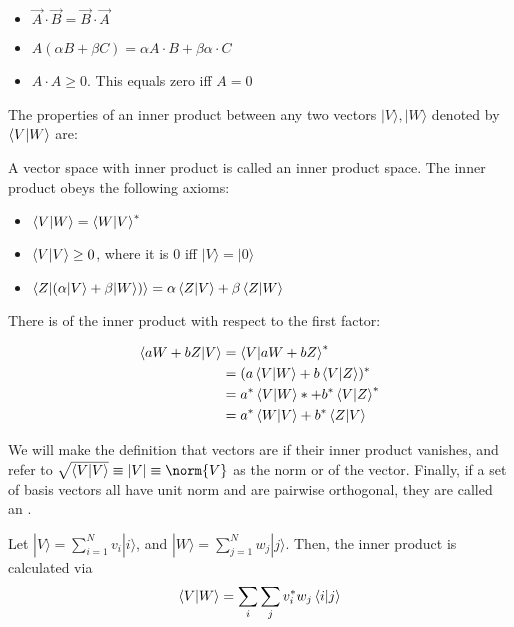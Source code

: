 \documentclass[11pt]{scrartcl}
\begin{document}
\begin{itemize}
	\item $ \vec{A} \cdot \vec{B} = \vec{B}\cdot \vec{A}$
	\item $A ( \alpha B + \beta C) = \alpha A\cdot B + \beta \alpha \cdot C$
	\item $A \cdot A \geq 0$. This equals zero iff $ A = 0 $
\end{itemize}

The properties of an inner product between any two vectors $ |V \rangle , |W \rangle  $ denoted by $ \braket{V|W}  $ are: 

\begin{definition}
A vector space with inner product is called an inner product space. The inner product obeys the following axioms:
\begin{itemize}
	\item $ \braket{V|W}  = \braket{W|V} ^* $
	\item $ \braket{V|V} \geq 0 $, where it is 0 iff $ |V \rangle  = |0 \rangle  $
	\item $ \braket{Z|(\alpha | V\rangle + \beta |W \rangle)}  = \alpha \braket{Z|V} + \beta \braket{Z|W}  $
\end{itemize}

\end{definition}

There is  of the inner product with respect to the first factor: 

\begin{align}
	\braket{aW + bZ|V} &= \braket{V|aW + bZ} ^* \\
			   &= (a \braket{V|W} + b \braket{V|Z} )^* \\
			   &= a^* \braket{V|W}* + b^* \braket{V|Z} ^* \\
			   &= a^* \braket{W|V} + b^* \braket{Z|V} 
\end{align}



We will make the definition that vectors are  if their inner product vanishes, and refer to $ \sqrt{ \braket{V|V} } \equiv | V | \equiv \norm{V}$ as the norm or  of the vector. Finally, if a set of basis vectors all have unit norm and are pairwise orthogonal, they are called an  .



Let $ |V\rangle = \sum_{i = 1}^{N} v_i|i\rangle $, and $ |W\rangle = \sum_{j  =1} ^ N w_j|j\rangle $. Then, the inner product is calculated via 
\begin{equation}
	\braket{V|W}  = \sum_i \sum_j v_i^* w_j \braket{i|j} 
\end{equation}
\end{document}
